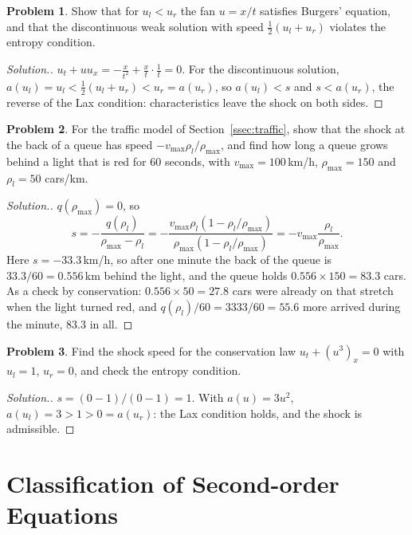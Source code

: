 \documentclass[11pt,a4paper]{article}
\numberwithin{equation}{section}
\theoremstyle{definition}
\newtheorem{problemx}{Problem}[subsection]
\newenvironment{problem}{\begin{problemx}}{\end{problemx}}
\newenvironment{solution}
  {\renewcommand{\qedsymbol}{}\begin{proof}[\textit{Solution}.]}
  {\end{proof}}
\begin{document}
\begin{problem}
Show that for $u_l < u_r$ the fan $u = x/t$ satisfies Burgers' equation, and that the discontinuous weak solution with speed $\frac12(u_l + u_r)$ violates the entropy condition.
\end{problem}

\begin{solution}
$u_t + uu_x = -\frac{x}{t^2} + \frac xt\cdot\frac1t = 0$. For the discontinuous solution, $a(u_l) = u_l < \frac12(u_l + u_r) < u_r = a(u_r)$, so $a(u_l) < s$ and $s < a(u_r)$, the reverse of the Lax condition: characteristics leave the shock on both sides.
\end{solution}

\begin{problem}
For the traffic model of Section~\ref{ssec:traffic}, show that the shock at the back of a queue has speed $-v_{\max}\rho_l/\rho_{\max}$, and find how long a queue grows behind a light that is red for $60$ seconds, with
$v_{\max} = 100$\,km/h, $\rho_{\max} = 150$ and $\rho_l = 50$ cars/km.
\end{problem}

\begin{solution}
$q(\rho_{\max}) = 0$, so
\[
s = -\frac{q(\rho_l)}{\rho_{\max} - \rho_l} = -\frac{v_{\max}\rho_l(1 - \rho_l/\rho_{\max})}{\rho_{\max}(1 - \rho_l/\rho_{\max})} = -v_{\max}\frac{\rho_l}{\rho_{\max}} .
\]
Here $s = -33.3$\,km/h, so after one minute the back of the queue is $33.3/60 = 0.556$\,km behind the light, and the queue holds $0.556 \times 150 = 83.3$ cars. As a check by conservation: $0.556 \times 50 = 27.8$ cars were already on that stretch when the light turned red, and $q(\rho_l)/60 = 3333/60 = 55.6$ more arrived during the minute, $83.3$ in all.
\end{solution}

\begin{problem}
Find the shock speed for the conservation law $u_t + (u^3)_x = 0$ with $u_l = 1$, $u_r = 0$, and check the entropy condition.
\end{problem}

\begin{solution}
$s = (0 - 1)/(0 - 1) = 1$. With $a(u) = 3u^2$, $a(u_l) = 3 > 1 > 0 = a(u_r)$: the Lax condition holds, and the shock is admissible.
\end{solution}

\section{Classification of Second-order Equations}
\label{sec:classification}
\end{document}
